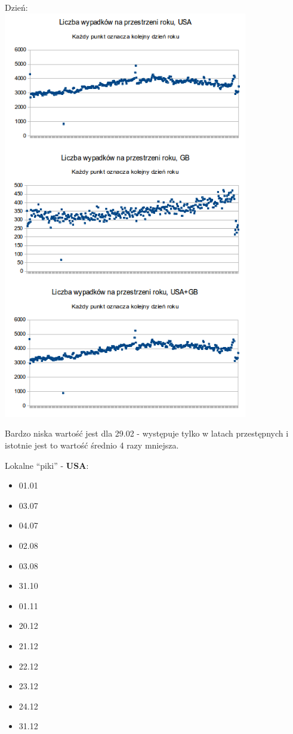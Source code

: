 Dzień:\\\includegraphics[width=0.8\textwidth]{images/statistics/day_of_year.png}

Bardzo niska wartość jest dla 29.02 - występuje tylko w latach
przestępnych i istotnie jest to wartość średnio 4 razy mniejsza.

Lokalne ``piki'' - \textbf{USA}:

\begin{itemize}
\itemsep1pt\parskip0pt
\item
  01.01\\
\item
  03.07\\
\item
  04.07\\
\item
  02.08\\
\item
  03.08\\
\item
  31.10\\
\item
  01.11\\
\item
  20.12\\
\item
  21.12\\
\item
  22.12\\
\item
  23.12\\
\item
  24.12\\
\item
  31.12
\end{itemize}

